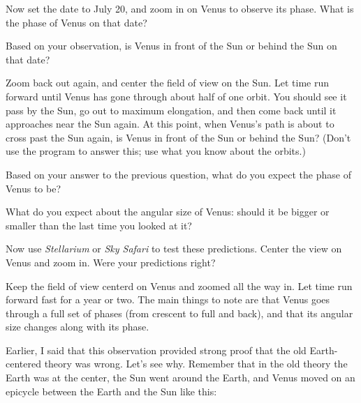 \answerspace{0.6in}

Now set the date to July 20, and 
zoom in on Venus to observe its phase.  What is the phase of Venus on that date?

\answerspace{0.6in}

\pagebreak[2]

Based on your observation, is Venus in front of the Sun or behind the Sun
on that date?

\answerspace{0.7in}

Zoom back out again, and center the field of view on the Sun.  Let time
run forward until Venus has gone through about half of one orbit.  You
should see it pass by the Sun, go out to maximum elongation, and then come
back until it approaches near the Sun again.  At this point, when
Venus's path is about to cross past the Sun again, is Venus in front
of the Sun or behind the Sun?  (Don't use the program to answer this; 
use what you know about the orbits.)

\answerspace{0.7in}

Based on your answer to the previous question, what do you expect the 
phase of Venus to be?

\answerspace{0.7in}

What do you expect about the angular size of Venus: should it be bigger
or smaller than the last time you looked at it?

\answerspace{0.7in}

Now use \textit{Stellarium} or \textit{Sky Safari} to
test these predictions.
Center the view on Venus and zoom in.
Were your predictions right?

\answerspace{0.7in}

Keep the field of view centerd on Venus and zoomed all the way in.  Let time
run forward fast for a year or two.  The main things to note are that
Venus goes through a full set of phases (from crescent to full and back),
and that its angular size changes along with its phase.

\pagebreak[3]

Earlier, I said that this observation provided strong proof that
the old Earth-centered theory was wrong.  Let's see why.  Remember that
in the old theory the Earth was at the center, the Sun went around the
Earth, and Venus moved on an epicycle between the Earth and the Sun like this:


